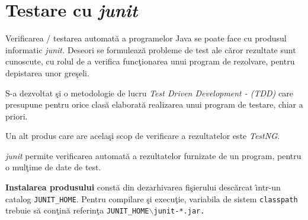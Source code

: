 \documentclass[12pt]{book}
\begin{document}
\chapter{Testare cu \textit{junit}}

Verificarea / testarea automat\u{a} a programelor Java se poate
face cu produsul informatic \textit{junit.}
Deseori se formuleaz\u{a} probleme de test ale c\u{a}ror
rezultate sunt cunoscute, cu rolul de a  verifica func\c{t}ionarea  
unui program de rezolvare, pentru depistarea unor gre\c{s}eli. 

S-a dezvoltat \c{s}i o metodologie de lucru \textit{Test Driven Development - (TDD)} care presupune pentru orice
clas\u{a} elaborat\u{a} realizarea unui program de testare, chiar a priori.

Un alt produs care are acela\c{s}i scop de verificare a rezultatelor este \textit{TestNG.}

\textit{junit} permite verificarea automat\u{a} a rezultatelor furnizate de
un program, pentru o mul\c{t}ime de date de test.

\textbf{Instalarea produsului} const\u{a} din dezarhivarea fi\c{s}ierului desc\u{a}rcat
\^{\i}ntr-un catalog \texttt{JUNIT\_HOME}.
Pentru compilare \c{s}i execu\c{t}ie, variabila de sistem \texttt{classpath}
trebuie s\u{a} con\c{t}in\u{a} referin\c{t}a \texttt{JUNIT\_HOME$\backslash$junit-*.jar.}
\end{document}
